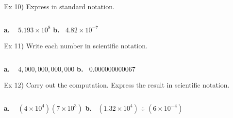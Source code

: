 \documentclass{ximera}
\begin{document}
$~$

\noindent Ex 10) Express in standard notation.

$~$

\textbf{a.} $~~~~$$\displaystyle 5.193 \times 10^8$ \hspace{2in} \textbf{b.}$~~~~$$\displaystyle 4.82 \times 10^{-7}$

\vspace{.75in}

\noindent Ex 11) Write each number in scientific notation.

$~$

\textbf{a.} $~~~~$$\displaystyle 4,000,000,000,000$ \hspace{2in} \textbf{b.}$~~~~$$\displaystyle 0.000000000067$

\vspace{.75in}

\noindent Ex 12) Carry out the computation.  Express the result in scientific notation.

$~$

\textbf{a.} $~~~~$$\displaystyle (4 \times 10^4)(7 \times 10^3)$ \hspace{2in} \textbf{b.}$~~~~$$\displaystyle (1.32 \times 10^4) \div (6 \times 10 ^{-4})$
\end{document}
